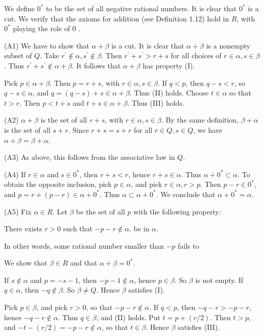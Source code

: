 \documentclass[10pt]{article}
\begin{document}
We define $0^{*}$ to be the set of all negative rational numbers. It is clear that $0^{*}$ is a cut. We verify that the axioms for addition (see Definition 1.12) hold in $R$, with $0^{*}$ playing the role of 0 .

(A1) We have to show that $\alpha+\beta$ is a cut. It is clear that $\alpha+\beta$ is a nonempty subset of $Q$. Take $r^{\prime} \notin \alpha, s^{\prime} \notin \beta$. Then $r^{\prime}+s^{\prime}>r+s$ for all choices of $r \in \alpha, s \in \beta$. Thus $r^{\prime}+s^{\prime} \notin \alpha+\beta$. It follows that $\alpha+\beta$ has property (I).

Pick $p \in \alpha+\beta$. Then $p=r+s$, with $r \in \alpha, s \in \beta$. If $q<p$, then $q-s<r$, so $q-s \in \alpha$, and $q=(q-s)+s \in \alpha+\beta$. Thus (II) holds. Choose $t \in \alpha$ so that $t>r$. Then $p<t+s$ and $t+s \in \alpha+\beta$. Thus (III) holds.

(A2) $\alpha+\beta$ is the set of all $r+s$, with $r \in \alpha, s \in \beta$. By the same definition, $\beta+\alpha$ is the set of all $s+r$. Since $r+s=s+r$ for all $r \in Q, s \in Q$, we have $\alpha+\beta=\beta+\alpha$.

(A3) As above, this follows from the associative law in $Q$.

(A4) If $r \in \alpha$ and $s \in 0^{*}$, then $r+s<r$, hence $r+s \in \alpha$. Thus $\alpha+0^{*} \subset \alpha$. To obtain the opposite inclusion, pick $p \in \alpha$, and pick $r \in \alpha, r>p$. Then $p-r \in 0^{*}$, and $p=r+(p-r) \in \alpha+0^{*}$. Thus $\alpha \subset \alpha+0^{*}$. We conclude that $\alpha+0^{*}=\alpha$.

(A5) Fix $\alpha \in R$. Let $\beta$ be the set of all $p$ with the following property:

There exists $r>0$ such that $-p-r \notin \alpha$. be in $\alpha$.

In other words, some rational number smaller than $-p$ fails to

We show that $\beta \in R$ and that $\alpha+\beta=0^{*}$.

If $s \notin \alpha$ and $p=-s-1$, then $-p-1 \notin \alpha$, hence $p \in \beta$. So $\beta$ is not empty. If $q \in \alpha$, then $-q \notin \beta$. So $\beta \neq Q$. Hence $\beta$ satisfies (I).

Pick $p \in \beta$, and pick $r>0$, so that $-p-r \notin \alpha$. If $q<p$, then $-q-r>-p-r$, hence $-q-r \notin \alpha$. Thus $q \in \beta$, and (II) holds. Put $t=p+(r / 2)$. Then $t>p$, and $-t-(r / 2)=-p-r \notin \alpha$, so that $t \in \beta$. Hence $\beta$ satisfies (III).
\end{document}
